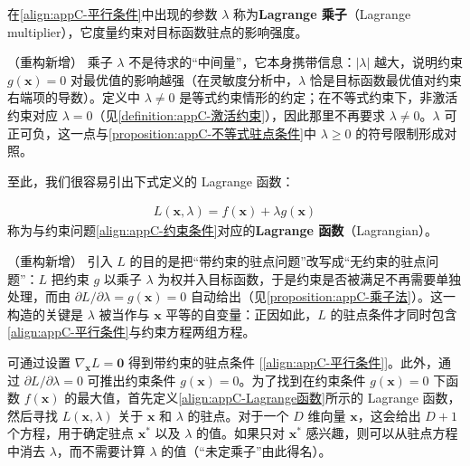 \documentclass[../main.tex]{subfiles}
\begin{document}
\begin{definition}[Lagrange 乘子]\label{definition:appC-乘子}
在\eqref{align:appC-平行条件}中出现的参数 $\lambda$ 称为\textbf{Lagrange 乘子}（Lagrange multiplier），它度量约束对目标函数驻点的影响强度。
\end{definition}

\begin{remark}（重构新增）
乘子 $\lambda$ 不是待求的“中间量”，它本身携带信息：$|\lambda|$ 越大，说明约束 $g(\bm{x})=0$ 对最优值的影响越强（在灵敏度分析中，$\lambda$ 恰是目标函数最优值对约束右端项的导数）。定义中 $\lambda\neq0$ 是等式约束情形的约定；在不等式约束下，非激活约束对应 $\lambda=0$（见\cref{definition:appC-激活约束}），因此那里不再要求 $\lambda\neq0$。$\lambda$ 可正可负，这一点与\cref{proposition:appC-不等式驻点条件}中 $\lambda\geqslant0$ 的符号限制形成对照。
\end{remark}

至此，我们很容易引出下式定义的 Lagrange 函数：
\begin{definition}[Lagrange 函数]\label{definition:appC-乘子函数}
\begin{align}
  L(\bm{x},\lambda)=f(\bm{x})+\lambda g(\bm{x})
  \label{align:appC-Lagrange函数}
\end{align}
称为与约束问题\eqref{align:appC-约束条件}对应的\textbf{Lagrange 函数}（Lagrangian）。
\end{definition}

\begin{remark}（重构新增）
引入 $L$ 的目的是把“带约束的驻点问题”改写成“无约束的驻点问题”：$L$ 把约束 $g$ 以乘子 $\lambda$ 为权并入目标函数，于是约束是否被满足不再需要单独处理，而由 $\partial L/\partial\lambda=g(\bm{x})=0$ 自动给出（见\cref{proposition:appC-乘子法}）。这一构造的关键是 $\lambda$ 被当作与 $\bm{x}$ 平等的自变量：正因如此，$L$ 的驻点条件才同时包含\eqref{align:appC-平行条件}与约束方程两组方程。
\end{remark}

可通过设置 $\nabla_{\bm{x}}L=\bm{0}$ 得到带约束的驻点条件 [\eqref{align:appC-平行条件}]。此外，通过 $\partial L/\partial\lambda=0$ 可推出约束条件 $g(\bm{x})=0$。为了找到在约束条件 $g(\bm{x})=0$ 下函数 $f(\bm{x})$ 的最大值，首先定义\eqref{align:appC-Lagrange函数}所示的 Lagrange 函数，然后寻找 $L(\bm{x},\lambda)$ 关于 $\bm{x}$ 和 $\lambda$ 的驻点。对于一个 $D$ 维向量 $\bm{x}$，这会给出 $D+1$ 个方程，用于确定驻点 $\bm{x}^{*}$ 以及 $\lambda$ 的值。如果只对 $\bm{x}^{*}$ 感兴趣，则可以从驻点方程中消去 $\lambda$，而不需要计算 $\lambda$ 的值（“未定乘子”由此得名）。
\end{document}
